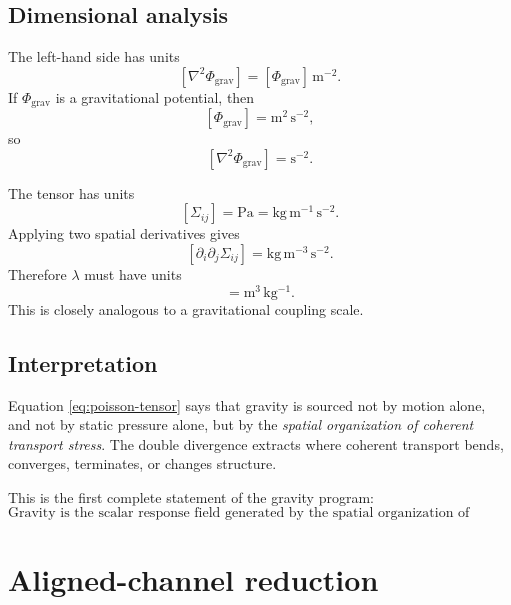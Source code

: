 \documentclass[11pt]{article}
\newcommand{\grav}{\mathrm{grav}}
\begin{document}
        \subsection{Dimensional analysis}
            
            The left-hand side has units
            \[
                [\nabla^2 \Phi_{\grav}] = [\Phi_{\grav}]\,\mathrm{m^{-2}}.
            \]
            If \(\Phi_{\grav}\) is a gravitational potential, then
            \[
                [\Phi_{\grav}] = \mathrm{m^2\,s^{-2}},
            \]
            so
            \[
                [\nabla^2 \Phi_{\grav}] = \mathrm{s^{-2}}.
            \]
            
            The tensor has units
            \[
                [\Sigma_{ij}] = \mathrm{Pa} = \mathrm{kg\,m^{-1}\,s^{-2}}.
            \]
            Applying two spatial derivatives gives
            \[
                [\partial_i\partial_j \Sigma_{ij}]
                =
                \mathrm{kg\,m^{-3}\,s^{-2}}.
            \]
            Therefore \(\lambda\) must have units
            \begin{equation}
                [\lambda] = \mathrm{m^3\,kg^{-1}}.
                \label{eq:lambda-units}
            \end{equation}
            This is closely analogous to a gravitational coupling scale.
        
        \subsection{Interpretation}
            
            Equation \eqref{eq:poisson-tensor} says that gravity is sourced not by motion alone, and not by static pressure alone, but by the \emph{spatial organization of coherent transport stress}. The double divergence extracts where coherent transport bends, converges, terminates, or changes structure.
            
            This is the first complete statement of the gravity program:
            \begin{equation}
                \boxed{
                    \text{Gravity is the scalar response field generated by the spatial organization of organized swirl transport.}
                }
                \label{eq:program-statement}
            \end{equation}
        
        \section{Aligned-channel reduction}
        
\end{document}
